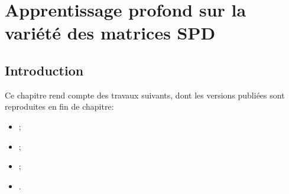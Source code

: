 \chapter{Apprentissage profond sur la variété des matrices SPD}
\label{ch:spdnet}

\section{Introduction}
\label{sec:spdnet-introduction}

\begin{contributions}
  Ce chapitre rend compte des travaux suivants, dont les versions publiées sont
  reproduites en fin de chapitre:
  \begin{itemize}
    \item {};
    \item {};
    \item {};
    \item {}.
  \end{itemize}
\end{contributions}

